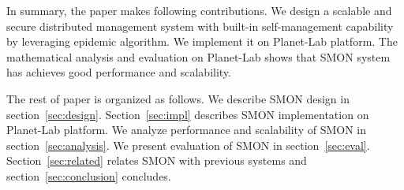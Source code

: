 In summary, the paper makes following contributions.  We
design a scalable and secure distributed management system
with built-in self-management capability by leveraging
epidemic algorithm.  We implement it on Planet-Lab platform.
The mathematical analysis and evaluation on Planet-Lab shows
that SMON system has achieves good performance and
scalability.

The rest of paper is organized as follows. We describe SMON
design in section~\ref{sec:design}.
Section~\ref{sec:impl} describes
SMON implementation on Planet-Lab platform. We analyze
performance and scalability of SMON in
section~\ref{sec:analysis}. We present evaluation of SMON in
section~\ref{sec:eval}.  Section~\ref{sec:related} relates
SMON with previous systems and section~\ref{sec:conclusion}
concludes.


